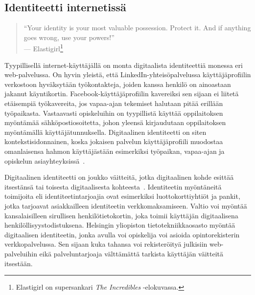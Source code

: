 \documentclass[finnish,gradu]{tktltiki}
\begin{document}




  \subsection{Identiteetti internetissä} %
  \label{sub:identiteetti_internetissä}

  \begin{quote}
    ``Your identity is your most valuable possession. Protect it.
    And if anything goes wrong, use your powers!''
    \\--- Elastigirl\footnote{
      Elastigirl on supersankari \emph{The Incredibles} -elokuvassa.
    }
  \end{quote}

  Tyypillisellä internet-käyttäjällä on monta digitaalista identiteettiä monessa eri web-palvelussa. On hyvin yleistä, että LinkedIn-yhteisöpalvelussa käyttäjäprofiilin verkostoon hyväksytään työkontakteja, joiden kanssa henkilö on ainoastaan jakanut käyntikortin. Facebook-käyttäjäprofiilin kavereiksi sen sijaan ei liitetä etäisempiä työkavereita, jos vapaa-ajan tekemiset halutaan pitää erillään työpaikasta. Vastaavasti opiskeluihin on tyypillistä käyttää oppilaitoksen myöntämää sähköpostiosoitetta, johon yleensä kirjaudutaan oppilaitoksen myöntämällä käyttäjätunnuksella. Digitaalinen identiteetti on siten kontekstisidonnainen, koska jokaisen palvelun käyttäjäprofiili muodostaa omanlaisensa hahmon käyttäjästään esimerkiksi työpaikan, vapaa-ajan ja opiskelun asiayhteyksissä~\cite{idwoman_identity_gplus_2011, guardianblog_gplus_id_2011}.

  Digitaalinen identiteetti on joukko väitteitä, jotka digitaalinen kohde esittää itsestänsä tai toisesta digitaalisesta kohteesta~\cite{cameron_laws_of_id_2005, sakimura_identity_2011, cameron_id_arch_2006}. Identiteetin myöntäneitä toimijoita eli identiteetintarjoajia ovat esimerkiksi luottokorttiyhtiöt ja pankit, jotka tarjoavat asiakkailleen identiteetin verkkomaksamiseen. Valtio voi myöntää kansalaisilleen sirullisen henkilötietokortin, joka toimii käyttäjän digitaalisena henkilöllisyystodistuksena. Helsingin yliopiston tietotekniikkaosasto myöntää digitaalisen identiteetin, jonka avulla voi opiskelija voi asioida opintorekisterin verkkopalvelussa. Sen sijaan kuka tahansa voi rekisteröityä julkisiin web-palveluihin eikä palveluntarjoaja välttämättä tarkista käyttäjän väitteitä itsestään.
\end{document}

